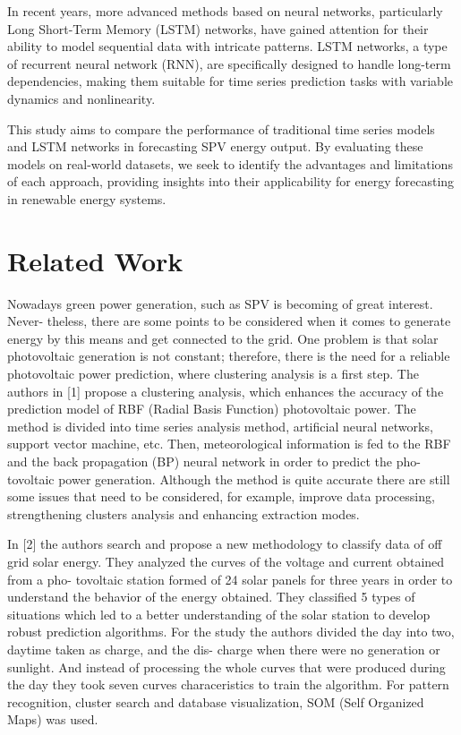 \documentclass[a4paper,12pt]{article}
\begin{document}
In recent years, more advanced methods based on neural networks, particularly Long Short-Term Memory (LSTM) networks, have gained attention for their ability to model sequential data with intricate patterns. LSTM networks, a type of recurrent neural network (RNN), are specifically designed to handle long-term dependencies, making them suitable for time series prediction tasks with variable dynamics and nonlinearity.

This study aims to compare the performance of traditional time series models and LSTM networks in forecasting SPV energy output. By evaluating these models on real-world datasets, we seek to identify the advantages and limitations of each approach, providing insights into their applicability for energy forecasting in renewable energy systems.

\section{Related Work}
Nowadays green power generation, such as SPV is becoming of great interest. Never-
theless, there are some points to be considered when it comes to generate energy by this
means and get connected to the grid. One problem is that solar photovoltaic generation
is not constant; therefore, there is the need for a reliable photovoltaic power prediction,
where clustering analysis is a first step. The authors in [1] propose a clustering analysis,
which enhances the accuracy of the prediction model of RBF (Radial Basis Function)
photovoltaic power. The method is divided into time series analysis method, artificial
neural networks, support vector machine, etc. Then, meteorological information is fed
to the RBF and the back propagation (BP) neural network in order to predict the pho-
tovoltaic power generation. Although the method is quite accurate there are still some
issues that need to be considered, for example, improve data processing, strengthening
clusters analysis and enhancing extraction modes.  

In [2] the authors search and propose a new methodology to classify data of off grid
solar energy. They analyzed the curves of the voltage and current obtained from a pho-
tovoltaic station formed of 24 solar panels for three years in order to understand the
behavior of the energy obtained. They classified 5 types of situations which led to a
better understanding of the solar station to develop robust prediction algorithms. For
the study the authors divided the day into two, daytime taken as charge, and the dis-
charge when there were no generation or sunlight. And instead of processing the whole
curves that were produced during the day they took seven curves characeristics to train the algorithm. For pattern recognition, cluster search and database visualization,
SOM (Self Organized Maps) was used.  
\end{document}
